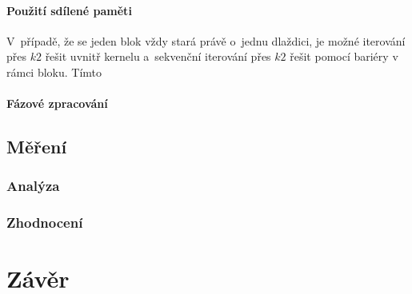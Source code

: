 \paragraph{Použití sdílené paměti}
V~případě, že se jeden blok vždy stará právě o~jednu dlaždici, je možné iterování přes $k2$ řešit uvnitř kernelu a~sekvenční iterování
přes $k2$ řešit pomocí bariéry v rámci bloku. Tímto

\paragraph{Fázové zpracování}

\subsection{Měření}\label{l:cuda:mereni}
\subsubsection{Analýza}
\subsubsection{Zhodnocení}


\section{Závěr}




\clearpage





